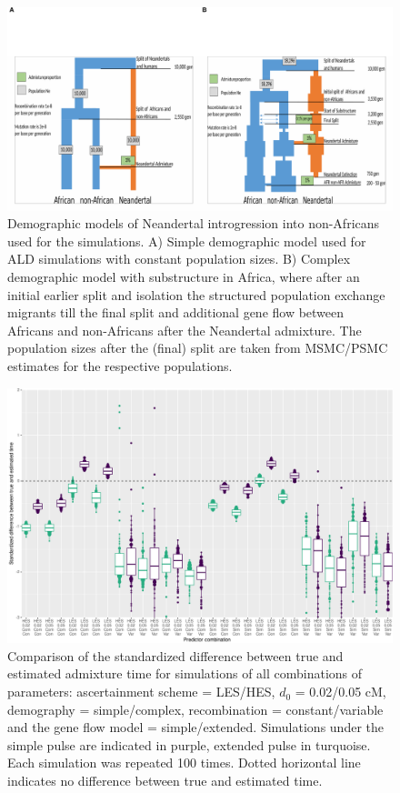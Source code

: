 \documentclass[11pt]{article}
\begin{document}
\begin{figure}
\centering
\includegraphics{Admixture_Time_Inference_Paper_Draft_files/figure-latex/figS1-1.pdf}
\caption{\label{fig:figS1} Demographic models of Neandertal introgression into non-Africans used for the simulations. A) Simple demographic model used for ALD simulations with constant population sizes. B) Complex demographic model with substructure in Africa, where after an initial earlier split and isolation the structured population exchange migrants till the final split and additional gene flow between Africans and non-Africans after the Neandertal admixture. The  population sizes after the (final) split are taken from MSMC/PSMC estimates for the respective populations.}
\end{figure}

\begin{figure}
\centering
\includegraphics{Admixture_Time_Inference_Paper_Draft_files/figure-latex/figS2-1.pdf}
\caption{\label{fig:figS2} Comparison of the standardized difference between true and estimated admixture time for simulations of all combinations of parameters: ascertainment scheme = LES/HES,  $d_{0}$ = 0.02/0.05 cM, demography = simple/complex, recombination = constant/variable and the gene flow model = simple/extended. Simulations under the simple pulse are indicated in purple, extended pulse in turquoise. Each simulation was repeated 100 times. Dotted horizontal line indicates no difference between true and estimated time.}
\end{figure}
\end{document}
